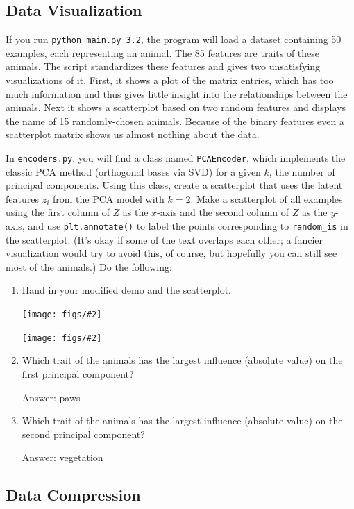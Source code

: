 \documentclass{article}
\def\ans#1{\par\gre{Answer: #1}}
\def\gre#1{{\color{gre}#1}}
\newcommand{\centerfig}[2]{\begin{center}\texttt{[image: figs/\#2]}\end{center}}
\newenvironment{asking}{\begingroup\color{blu}}{\endgroup}
\begin{document}
\pagebreak

\subsection{Data Visualization}

If you run \verb|python main.py 3.2|, the program will load a dataset containing 50 examples, each representing an animal.
The 85 features are traits of these animals.
The script standardizes these features and gives two unsatisfying visualizations of it.
First, it shows a plot of the matrix entries, which has too much information and thus gives little insight into the relationships between the animals.
Next it shows a scatterplot based on two random features and displays the name of 15 randomly-chosen animals.
Because of the binary features even a scatterplot matrix shows us almost nothing about the data.

In {\texttt{encoders.py}}, you will find {a class named \texttt{PCAEncoder}}, which implements the classic PCA method (orthogonal bases via SVD) for a given $k$, the number of principal components. Using this class, create a scatterplot that uses the latent features $z_i$ from the PCA model with $k=2$.
Make a scatterplot of all examples using the first column of $Z$ as the $x$-axis and the second column of $Z$ as the $y$-axis, and use \texttt{plt.annotate()} to label the points corresponding to \verb|random_is| in the scatterplot.
(It's okay if some of the text overlaps each other; a fancier visualization would try to avoid this, of course, but hopefully you can still see most of the animals.)
Do the following:
\begin{asking}
	\begin{enumerate}
		\item Hand in your modified demo and the scatterplot.
            \centerfig{0.6}{animals_random_PCA}
            \centerfig{0.8}{q3.2.1-code}
		\item Which trait of the animals has the largest influence (absolute value) on the first principal component?
            \ans{paws}
		\item Which trait of the animals has the largest influence (absolute value) on the second principal component?
            \ans{vegetation}
    \end{enumerate}
\end{asking}

\pagebreak

\subsection{Data Compression}
\end{document}
